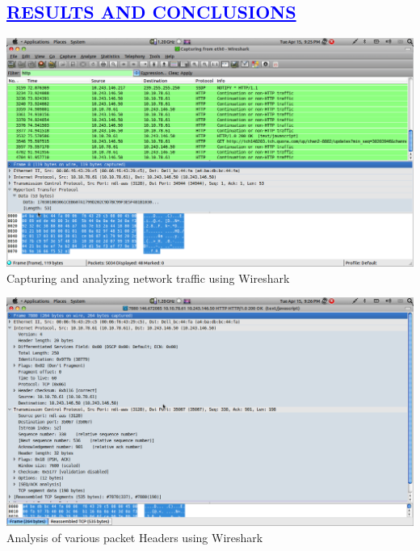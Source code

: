 \documentclass[a4paper,12pt]{report}
\begin{document}
\begin{center}
\chapter{\textcolor{blue}{\underline {RESULTS AND CONCLUSIONS}}}\end{center}

\begin{center}
 \includegraphics[width=13 cm,height=12 cm]{./Screenshot-1.png}
Capturing and analyzing network traffic using Wireshark
\end{center}
\begin{center}
 \includegraphics[width=13 cm,height=12 cm]{./Screenshot-2.png}
Analysis of various packet Headers using Wireshark
\end{center}
\end{document}
